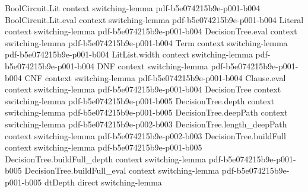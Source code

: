 \begin{theorem}
\label{SwitchingLemmaCNF.switching_lemma_cnf}
\leanok
{}
\proofstep
  {BoolCircuit.Lit}
  {context}
  {switching-lemma}
  {pdf-b5e074215b9e-p001-b004}
\proofstep
  {BoolCircuit.Lit.eval}
  {context}
  {switching-lemma}
  {pdf-b5e074215b9e-p001-b004}
\proofstep
  {Literal}
  {context}
  {switching-lemma}
  {pdf-b5e074215b9e-p001-b004}
\proofstep
  {DecisionTree.eval}
  {context}
  {switching-lemma}
  {pdf-b5e074215b9e-p001-b004}
\proofstep
  {Term}
  {context}
  {switching-lemma}
  {pdf-b5e074215b9e-p001-b004}
\proofstep
  {LitList.width}
  {context}
  {switching-lemma}
  {pdf-b5e074215b9e-p001-b004}
\proofstep
  {DNF}
  {context}
  {switching-lemma}
  {pdf-b5e074215b9e-p001-b004}
\proofstep
  {CNF}
  {context}
  {switching-lemma}
  {pdf-b5e074215b9e-p001-b004}
\proofstep
  {Clause.eval}
  {context}
  {switching-lemma}
  {pdf-b5e074215b9e-p001-b004}
\proofstep
  {DecisionTree}
  {context}
  {switching-lemma}
  {pdf-b5e074215b9e-p001-b005}
\proofstep
  {DecisionTree.depth}
  {context}
  {switching-lemma}
  {pdf-b5e074215b9e-p001-b005}
\proofstep
  {DecisionTree.deepPath}
  {context}
  {switching-lemma}
  {pdf-b5e074215b9e-p002-b003}
\proofstep
  {DecisionTree.length_deepPath}
  {context}
  {switching-lemma}
  {pdf-b5e074215b9e-p002-b003}
\proofstep
  {DecisionTree.buildFull}
  {context}
  {switching-lemma}
  {pdf-b5e074215b9e-p001-b005}
\proofstep
  {DecisionTree.buildFull_depth}
  {context}
  {switching-lemma}
  {pdf-b5e074215b9e-p001-b005}
\proofstep
  {DecisionTree.buildFull_eval}
  {context}
  {switching-lemma}
  {pdf-b5e074215b9e-p001-b005}
\proofstep
  {dtDepth}
  {direct}
  {switching-lemma}

\end{theorem}
